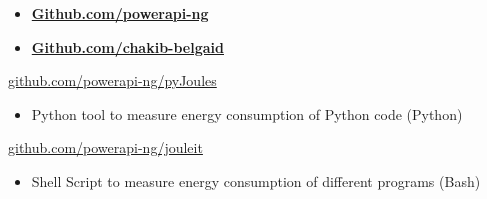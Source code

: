 \documentclass[10pt,a4paper,ragged2e,withhyper]{altacv}
\begin{document}
\begin{paracol}{2}
  \switchcolumn



  \medskip












  \begin{itemize}
    \item   \textbf{\color{accent}\href{https://github.com/powerapi-ng}
            {Github.com/powerapi-ng}}
    \item \textbf{\color{accent}\href{https://github.com/chakib-belgaid}
            {Github.com/chakib-belgaid}}
  \end{itemize}

  \divider
   {\href{https://github.com/powerapi-ng/pyJoules}{github.com/powerapi-ng/pyJoules}}{}{}
  \begin{itemize}
    \item  Python tool to measure energy consumption of Python code (Python)
  \end{itemize}

  \divider
   {\href{https://github.com/powerapi-ng/jouleit}{github.com/powerapi-ng/jouleit}}{}{}
  \begin{itemize}
    \item  Shell Script to measure energy consumption of different programs (Bash)
  \end{itemize}


\end{paracol}
\end{document}
